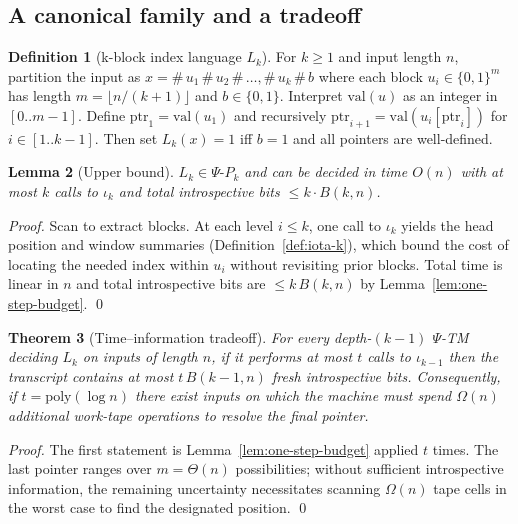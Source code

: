 \documentclass[11pt]{article}
\newtheorem{theorem}{Theorem}[section]
\newtheorem{lemma}[theorem]{Lemma}
\theoremstyle{definition}
\newtheorem{definition}[theorem]{Definition}
\newcommand{\PSi}{\Psi}
\newcommand{\PsiPk}{\PSi\text{-}P_k}
\newcommand{\bits}{\{0,1\}}
\begin{document}
\subsection{A canonical family and a tradeoff}

\begin{definition}[k-block index language $L_k$]
\label{def:Lk}
For $k\ge1$ and input length $n$, partition the input as $x=\#\,u_1\,\#\,u_2\,\#\,\ldots,\#\,u_k\,\#\,b$ where each block $u_i\in\bits^{m}$ has length $m=\lfloor n/(k{+}1)\rfloor$ and $b\in\bits$. Interpret $\mathrm{val}(u)$ as an integer in $[0..m{-}1]$. Define $\mathrm{ptr}_1=\mathrm{val}(u_1)$ and recursively $\mathrm{ptr}_{i+1}=\mathrm{val}(u_{i}[\mathrm{ptr}_i])$ for $i\in[1..k{-}1]$. Then set $L_k(x)=1$ iff $b=1$ and all pointers are well-defined.
\end{definition}

\begin{lemma}[Upper bound]
\label{lem:Lk-upper}
$L_k\in \PsiPk$ and can be decided in time $O(n)$ with at most $k$ calls to $\iota_k$ and total introspective bits $\le k\cdot B(k,n)$.
\end{lemma}
\begin{proof}
Scan to extract blocks. At each level $i\le k$, one call to $\iota_k$ yields the head position and window summaries (Definition~\ref{def:iota-k}), which bound the cost of locating the needed index within $u_i$ without revisiting prior blocks. Total time is linear in $n$ and total introspective bits are $\le k\,B(k,n)$ by Lemma~\ref{lem:one-step-budget}. \qed
\end{proof}

\begin{theorem}[Time–information tradeoff]
\label{thm:tradeoff}
For every depth-$(k{-}1)$ $\PSi$-TM deciding $L_k$ on inputs of length $n$, if it performs at most $t$ calls to $\iota_{k-1}$ then the transcript contains at most $t\,B(k{-}1,n)$ fresh introspective bits. Consequently, if $t=\mathrm{poly}(\log n)$ there exist inputs on which the machine must spend $\Omega(n)$ additional work-tape operations to resolve the final pointer.
\end{theorem}
\begin{proof}
The first statement is Lemma~\ref{lem:one-step-budget} applied $t$ times. The last pointer ranges over $m=\Theta(n)$ possibilities; without sufficient introspective information, the remaining uncertainty necessitates scanning $\Omega(n)$ tape cells in the worst case to find the designated position. \qed
\end{proof}
\end{document}
